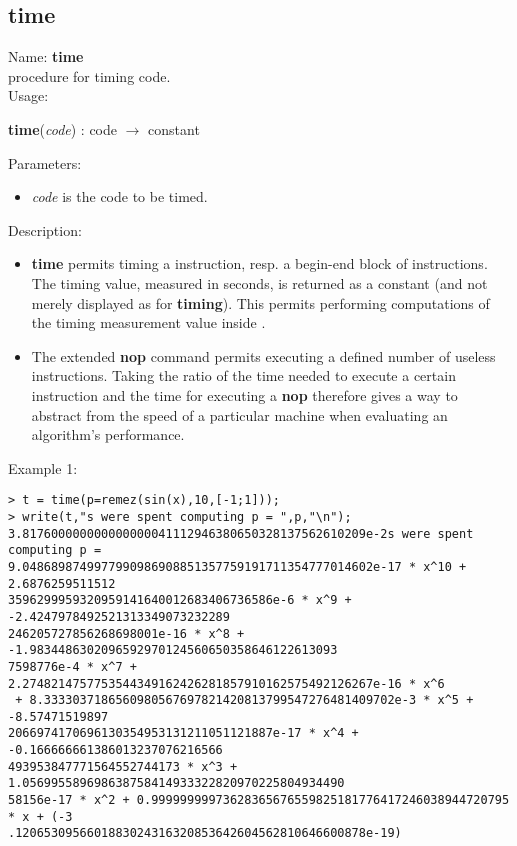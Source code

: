 \subsection{time}
\label{labtime}
\noindent Name: \textbf{time}\\
\phantom{aaa}procedure for timing \sollya code.\\[0.2cm]
\noindent Usage: 
\begin{center}
\textbf{time}(\emph{code}) : \textsf{code} $\rightarrow$ \textsf{constant}\\
\end{center}
Parameters: 
\begin{itemize}
\item \emph{code} is the code to be timed.
\end{itemize}
\noindent Description: \begin{itemize}

\item \textbf{time} permits timing a \sollya instruction, resp. a begin-end block
   of \sollya instructions. The timing value, measured in seconds, is returned
   as a \sollya constant (and not merely displayed as for \textbf{timing}). This 
   permits performing computations of the timing measurement value inside \sollya.

\item The extended \textbf{nop} command permits executing a defined number of
   useless instructions. Taking the ratio of the time needed to execute a
   certain \sollya instruction and the time for executing a \textbf{nop}
   therefore gives a way to abstract from the speed of a particular 
   machine when evaluating an algorithm's performance.
\end{itemize}
\noindent Example 1: 
\begin{center}\begin{minipage}{15cm}\begin{Verbatim}[frame=single,commandchars=\\\|\~]
> t = time(p=remez(sin(x),10,[-1;1]));
> write(t,"s were spent computing p = ",p,"\n");
3.817600000000000000041112946380650328137562610209e-2s were spent computing p = 
9.0486898749977990986908851357759191711354777014602e-17 * x^10 + 2.6876259511512
3596299959320959141640012683406736586e-6 * x^9 + -2.4247978492521313349073232289
246205727856268698001e-16 * x^8 + -1.9834486302096592970124560650358646122613093
7598776e-4 * x^7 + 2.2748214757753544349162426281857910162575492126267e-16 * x^6
 + 8.3333037186560980567697821420813799547276481409702e-3 * x^5 + -8.57471519897
2066974170696130354953131211051121887e-17 * x^4 + -0.166666661386013237076216566
493953847771564552744173 * x^3 + 1.056995589698638758414933322820970225804934490
58156e-17 * x^2 + 0.99999999973628365676559825181776417246038944720795 * x + (-3
.1206530956601883024316320853642604562810646600878e-19)
\end{Verbatim}
\end{minipage}\end{center}
